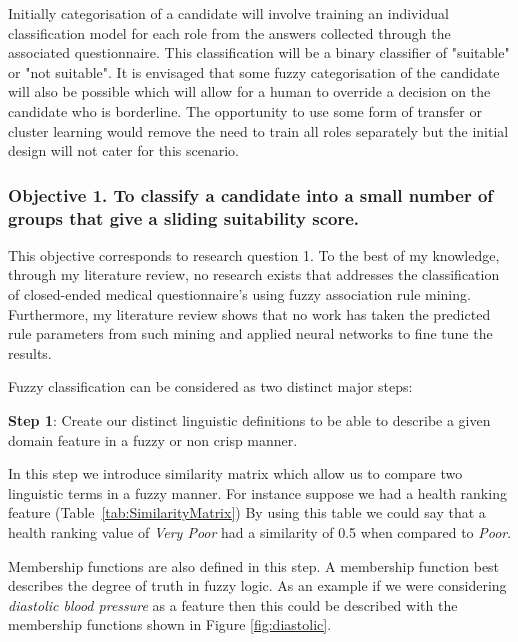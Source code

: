 Initially categorisation of a candidate will involve training an individual classification model for each role from
the answers collected through the associated questionnaire. This classification will be a binary classifier
of "suitable" or "not suitable". It is envisaged that some fuzzy categorisation of the candidate will also be
possible which will allow for a human to override a decision on the candidate who is borderline. The opportunity
to use some form of transfer or cluster learning would remove the need to train all roles separately but the initial
design will not cater for this scenario.

\subsubsection{Objective 1. To classify a candidate into a small number of groups that give a sliding suitability score.}

This objective corresponds to research question 1. To the best of my knowledge, through my literature review, no research exists that addresses the classification of closed-ended medical questionnaire's using fuzzy association rule mining. Furthermore, my literature review shows that no work has taken the predicted rule parameters from such mining and applied neural networks to fine tune the results.

\noindent
Fuzzy classification can be considered as two distinct major steps:

\noindent
\textbf{Step 1}: Create our distinct linguistic definitions to be able to describe a given domain feature in a fuzzy or non crisp manner.

In this step we introduce similarity matrix which allow us to compare two linguistic terms in a fuzzy manner. For instance suppose we had a health ranking feature (Table~\ref{tab:SimilarityMatrix}) By using this table we could say that a health ranking value of \textit{Very Poor} had a similarity of 0.5 when compared to \textit{Poor}.



Membership functions are also defined in this step. A membership function best describes the degree of truth in fuzzy logic. As an example if we were considering \textit{diastolic blood pressure} as a feature then this could be described with the membership functions shown in Figure \ref{fig:diastolic}.



